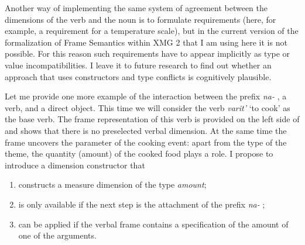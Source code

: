 Another way of implementing the same system of agreement between the dimensions of the verb and the noun is to formulate requirements (here, for example, a requirement for a temperature scale), but in the current version of the formalization of Frame Semantics within XMG 2 that I am using here it is not possible. For this reason such requirements have to appear implicitly as type or value incompatibilities. I leave it to future  research to find out whether an approach that uses constructors and type conflicts is cognitively plausible.


Let me provide one more example of the interaction between the prefix \textit{na-}  , a verb, and a direct object. This time we will consider the verb \textit{varit'} `to cook' as the base verb. The frame representation of this verb is provided on the left side of  and shows that there is no preselected verbal dimension. At the same time the frame uncovers the parameter of the cooking event: apart from the type of the theme, the quantity (amount) of the cooked food plays a role. I propose to introduce a dimension constructor that
\begin{enumerate}
\item constructs a measure dimension of the type \textit{amount};
\item is only available if the next step is the attachment of the prefix \textit{na-}  ;
\item can be applied if the verbal frame contains a specification of the amount of one of the arguments.
\end{enumerate}

